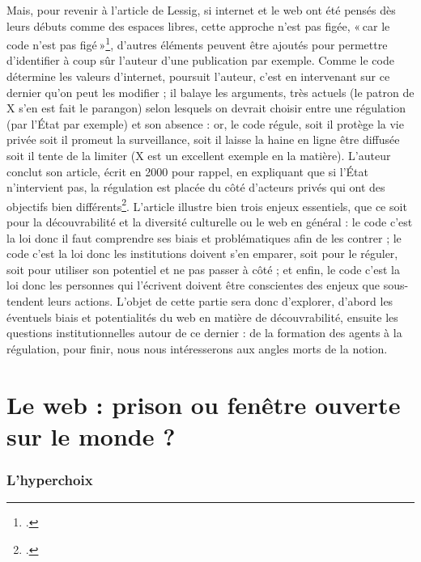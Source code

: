 Mais, pour revenir à l’article de Lessig, si internet et le web ont été pensés dès leurs débuts comme des espaces libres, cette approche n’est pas figée, « car le code n’est pas figé »\footcite[§ 6]{lessig_code_2000}, d’autres éléments peuvent être ajoutés pour permettre d’identifier à coup sûr l’auteur d’une publication par exemple. Comme le code détermine les valeurs d’internet, poursuit l’auteur, c’est en intervenant sur ce dernier qu’on peut les modifier ; il balaye les arguments, très actuels (le patron de X s’en est fait le parangon) selon lesquels on devrait choisir entre une régulation (par l’État par exemple) et son absence : or, le code régule, soit il protège la vie privée soit il promeut la surveillance, soit il laisse la haine en ligne être diffusée soit il tente de la limiter (X est un excellent exemple en la matière). L’auteur conclut son article, écrit en 2000 pour rappel, en expliquant que si l’État n’intervient pas, la régulation est placée du côté d’acteurs privés qui ont des objectifs bien différents\footcite[§ 28]{lessig_code_2000}. L’article illustre bien trois enjeux essentiels, que ce soit pour la découvrabilité et la diversité culturelle ou le web en général : le code c’est la loi donc il faut comprendre ses biais et problématiques afin de les contrer ; le code c’est la loi donc les institutions doivent s’en emparer, soit pour le réguler, soit pour utiliser son potentiel et ne pas passer à côté ; et enfin, le code c’est la loi donc les personnes qui l’écrivent doivent être conscientes des enjeux que sous-tendent leurs actions. L’objet de cette partie sera donc d’explorer, d’abord les éventuels biais et potentialités du web en matière de découvrabilité, ensuite les questions institutionnelles autour de ce dernier : de la formation des agents à la régulation, pour finir, nous nous intéresserons aux angles morts de la notion.

\chapter{Le web : prison ou fenêtre ouverte sur le monde ?}

\subsection{L'hyperchoix}

